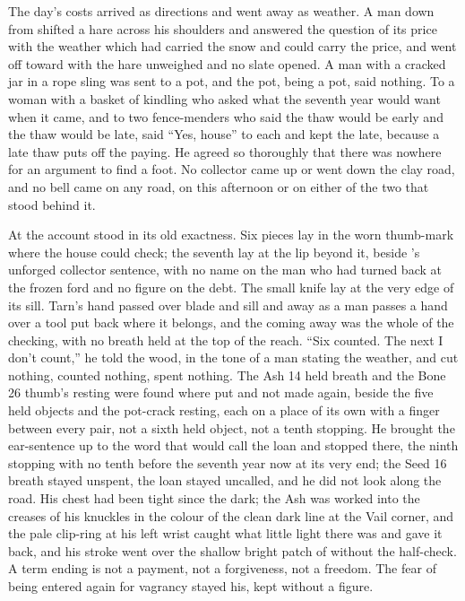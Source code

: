 \scenebreak

The day's costs arrived as directions and went away as weather. A man down from  shifted a hare across his shoulders and answered the question of its price with the weather which had carried the snow and could carry the price, and went off toward  with the hare unweighed and no slate opened. A man with a cracked jar in a rope sling was sent to a pot, and the pot, being a pot, said nothing. To a woman with a basket of kindling who asked what the seventh year would want when it came, and to two fence-menders who said the thaw would be early and the thaw would be late,  said “Yes, house” to each and kept the late, because a late thaw puts off the paying. He agreed so thoroughly that there was nowhere for an argument to find a foot. No collector came up or went down the clay road, and no bell came on any road, on this afternoon or on either of the two that stood behind it.

At  the account stood in its old exactness. Six pieces lay in the worn thumb-mark where the house could check; the seventh lay at the lip beyond it, beside 's unforged collector sentence, with no name on the man who had turned back at the frozen ford and no figure on the debt. The small knife lay at the very edge of its sill. Tarn's hand passed over blade and sill and away as a man passes a hand over a tool put back where it belongs, and the coming away was the whole of the checking, with no breath held at the top of the reach. “Six counted. The next I don't count,” he told the wood, in the tone of a man stating the weather, and cut nothing, counted nothing, spent nothing. The Ash 14 held breath and the Bone 26 thumb's resting were found where put and not made again, beside the five held objects and the pot-crack resting, each on a place of its own with a finger between every pair, not a sixth held object, not a tenth stopping. He brought the ear-sentence up to the word that would call the loan and stopped there, the ninth stopping with no tenth before the seventh year now at its very end; the Seed 16 breath stayed unspent, the loan stayed uncalled, and he did not look along the road. His chest had been tight since the dark; the Ash was worked into the creases of his knuckles in the colour of the clean dark line at the Vail corner, and the pale clip-ring at his left wrist caught what little light there was and gave it back, and his stroke went over the shallow bright patch of  without the half-check. A term ending is not a payment, not a forgiveness, not a freedom. The fear of being entered again for vagrancy stayed his, kept without a figure.

